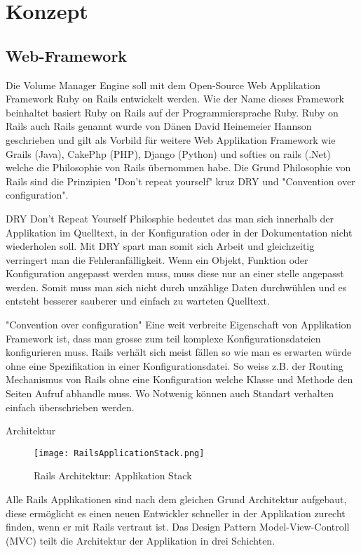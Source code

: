 \section{Konzept}

\subsection{Web-Framework}
Die Volume Manager Engine soll mit dem Open-Source Web Applikation Framework Ruby on Rails entwickelt werden. Wie der Name dieses Framework beinhaltet basiert Ruby on Rails auf der Programmiersprache Ruby.
Ruby on Rails auch Rails genannt wurde von Dänen David Heinemeier Hannson geschrieben und gilt als Vorbild für weitere Web Applikation Framework wie Grails (Java), CakePhp (PHP), Django (Python) und softies on rails (.Net)  welche die Philosophie von Rails übernommen habe. Die Grund Philosophie von Rails sind die Prinzipien "Don't repeat yourself" kruz DRY und "Convention over configuration".

DRY
Don't Repeat Yourself Philosphie bedeutet das man sich innerhalb der Applikation im Quelltext, in der Konfiguration oder in der Dokumentation nicht wiederholen soll. Mit DRY spart man somit sich Arbeit und gleichzeitig verringert man die Fehleranfälligkeit. Wenn ein Objekt, Funktion oder Konfiguration angepasst werden muss, muss diese nur an einer stelle angepasst werden. Somit muss man sich nicht durch unzählige Daten durchwühlen und es entsteht besserer sauberer und einfach zu warteten Quelltext.


"Convention over configuration"
Eine weit verbreite Eigenschaft von Applikation Framework ist, dass man grosse zum teil komplexe Konfigurationsdateien konfigurieren muss. Rails verhält sich meist fällen so wie man es erwarten würde ohne eine Spezifikation in einer Konfigurationsdatei.  So weiss z.B. der Routing Mechanismus von Rails ohne eine Konfiguration welche Klasse und Methode den Seiten Aufruf abhandle muss. Wo Notwenig können auch Standart verhalten einfach überschrieben werden.

Architektur

\begin{figure}[htb]
\centering
\texttt{[image: RailsApplicationStack.png]}
\caption{Rails Architektur: Applikation Stack}
\label{fig:Rails Applikation Stack}
\end{figure}

Alle Rails Applikationen sind nach dem gleichen Grund Architektur aufgebaut, diese ermöglicht es einen neuen Entwickler schneller in der Applikation zurecht finden, wenn er mit Rails vertraut ist. 
Das Design Pattern Model-View-Controll (MVC) teilt die Architektur der Applikation in drei Schichten.

